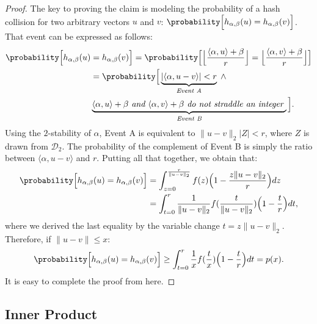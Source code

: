 \begin{proof}
    The key to proving the claim is modeling the probability of a hash collision for two
    arbitrary vectors $u$ and $v$: $\probability\Big[ h_{\alpha, \beta}(u) = h_{\alpha, \beta}(v) \Big]$.
    That event can be expressed as follows:
    \begin{align*}
        \probability\Big[ h_{\alpha, \beta}(u) &= h_{\alpha, \beta}(v) \Big] = 
        \probability\Big[ \Big\lfloor \frac{\langle \alpha, u \rangle + \beta}{r} \Big\rfloor =  \Big\lfloor \frac{\langle \alpha, v \rangle + \beta}{r} \Big\rfloor \Big] \\
        &= \probability\Big[ \underbrace{\lvert \langle \alpha, u - v \rangle \rvert < r}_{\textit{Event A}} \;\land \\
        &\underbrace{\langle \alpha, u \rangle + \beta \textit{ and } \langle \alpha, v \rangle + \beta \textit{ do not straddle an integer }}_{\textit{Event B}} \Big].
    \end{align*}
    Using the $2$-stability of $\alpha$, Event A is equivalent to $\lVert u - v \rVert_2 \lvert Z \rvert < r$,
    where $Z$ is drawn from $\mathcal{D}_2$. The probability of the complement of Event B is simply
    the ratio between $\langle \alpha, u - v \rangle$ and $r$. Putting all that together, we obtain that:
    \begin{align*}
        \probability\Big[ h_{\alpha, \beta}(u) = h_{\alpha, \beta}(v) \Big] &= 
        \int_{z = 0}^{\frac{r}{\lVert u - v \rVert_2}} f(z) \Big( 1 - \frac{z \lVert u - v \rVert_2}{r} \Big) dz \\
        &= \int_{t = 0}^{r} \frac{1}{\lVert u - v \rVert_2} f(\frac{t}{\lVert u - v \rVert_2}) \Big( 1 - \frac{t}{r} \Big) dt,
    \end{align*}
    where we derived the last equality by the variable change $t = z \lVert u - v \rVert_2$.
    Therefore, if $\lVert u - v \rVert \leq x$:
    \begin{equation*}
        \probability\Big[ h_{\alpha, \beta}(u) = h_{\alpha, \beta}(v) \Big] \geq
        \int_{t = 0}^{r} \frac{1}{x} f(\frac{t}{x}) \Big( 1 - \frac{t}{r} \Big) dt = p(x).
    \end{equation*}
    It is easy to complete the proof from here.
\end{proof}

\subsection{Inner Product}
\label{section:lsh:ip}

